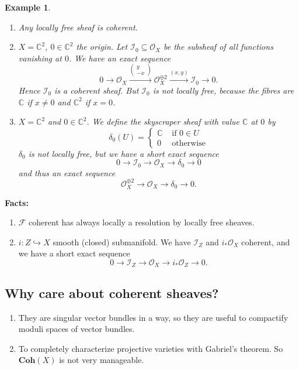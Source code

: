 \documentclass[12pt]{article}
\theoremstyle{darkgreentheorem}
\theoremstyle{darkbluedefinition}
\theoremstyle{darkredexample}
\newtheorem{exa}[thm]{Example}
\theoremstyle{remark}
\newcommand{\1}{\mathbbm{1}}
\newcommand{\C}{\mathbb{C}}
\newcommand{\Coh}{\mathbf{Coh}}
\newcommand{\F}{\mathcal{F}}
\renewcommand{\O}{\mathcal{O}}
\newcommand{\I}{\mathcal{I}}
\newcommand{\op}{\oplus}
\newcommand{\sub}{\subseteq}
\newcommand{\mono}{\hookrightarrow}
\begin{document}
\begin{exa}
    \begin{enumerate}
	\item Any locally free sheaf is coherent.
	\item $X=\C^{2}$, $0\in \C^{2}$ the origin.
	    Let $\I_{0}\sub \O_{X}$ be the subsheaf of all functions vanishing at $0$.
	    We have an exact sequence
	    \[ 0\to \O_{X}\xrightarrow{\begin{pmatrix} y \\ -x \end{pmatrix}} \O_{X}^{\op 2}\xrightarrow{(x,y)} \I_{0}\to 0.\]
	    Hence $\I_{0}$ is a coherent sheaf.
	    But $\I_{0}$ is not locally free, because the fibres are $\C$ if $x\neq 0$ and $\C^{2}$ if $x=0$.
	\item $X=\C^{2}$ and $0\in \C^{2}$.
	    We define the skyscraper sheaf with value $\C$ at $0$ by
	    \[ \delta_{0}(U)=
	    \begin{cases}
		\C &\text{ if } 0\in U \\
		0 &\text{ otherwise}
	    \end{cases}
	    \]
	    $\delta_{0}$ is not locally free, but we have a short exact sequence
	    \[ 0\to \I_{0}\to \O_{X}\to \delta_{0}\to 0 \]
	    and thus an exact sequence
	    \[ \O_{X}^{\op 2}\to \O_{X}\to \delta_{0}\to 0.\]
    \end{enumerate}
\end{exa}

\textbf{Facts:}
\begin{enumerate}
    \item $\F$ coherent has always locally a resolution by locally free sheaves.
    \item $i\colon Z\mono X$ smooth (closed) submanifold.
	We have $\I_{Z}$ and $i_{*}\O_{X}$ coherent, and we have a short exact sequence
	\[ 0\to \I_{Z}\to \O_{X}\to i_{*}\O_{Z}\to 0.\]
\end{enumerate}

\subsection{Why care about coherent sheaves?}

\begin{enumerate}
    \item They are singular vector bundles in a way, so they are useful to compactify moduli spaces of vector bundles.
    \item To completely characterize projective varieties with Gabriel's theorem.
	So $\Coh(X)$ is not very manageable.
\end{enumerate}
\end{document}
